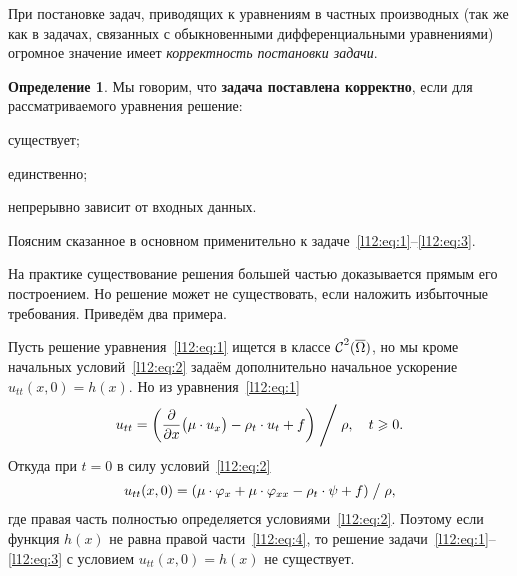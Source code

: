 \documentclass[12pt,a4paper,openany,fleqn]{book}
\newcommand{\Cf}{\ensuremath{\mathcal{C}}}
\newcommand{\Cfn}[2][]{\ensuremath{\Cf{\mathstrut}^{#2}_{#1}}}
\newcommand{\pder}[2]{\ensuremath{\frac{\partial#1}{\partial#2}}}
\theoremstyle{definition}
\newtheorem{_def}{Определение}[section]
\begin{document}
	При постановке задач, приводящих к уравнениям в частных производных (так же как в задачах, связанных с обыкновенными дифференциальными уравнениями) огромное значение имеет \emph{корректность постановки задачи}.
	\begin{_def}
		Мы говорим, что \textbf{задача поставлена корректно}, если для рассматриваемого уравнения решение:
		\begin{enumerateD}
			\item существует;
			\item единственно;
			\item непрерывно зависит от входных данных.
		\end{enumerateD} 
	\end{_def}
\noindent Поясним сказанное в основном применительно к задаче~\eqref{l12:eq:1}--\eqref{l12:eq:3}.
\begin{enumerateD}
	\item На практике существование решения большей частью доказывается прямым его построением. Но решение может не существовать, если наложить избыточные требования. Приведём два примера.
	\begin{enumerateD}
		\item Пусть решение уравнения~\eqref{l12:eq:1} ищется в классе $\Cfn{2}(\overline{\Omega})$, но мы кроме начальных условий~\eqref{l12:eq:2} задаём дополнительно начальное ускорение $u_{tt}(x,0)=h(x)$. Но из уравнения~\eqref{l12:eq:1}
		\begin{equation*}
			u_{tt}=\left(\pder{}{x}\big(\mu\cdot u_x\big)-\rho_t\cdot u_t+f\right)\Biggm/\rho,\quad t\geqslant0.
		\end{equation*}
		Откуда при $t=0$ в силу условий~\eqref{l12:eq:2}
		\begin{equation}
			\label{l12:eq:4}
			u_{tt}(x,0)=\left(\mu\cdot\phi_x+\mu\cdot\phi_{xx}-\rho_t\cdot\psi+f\right)\bigm/\rho,
		\end{equation}
		где правая часть полностью определяется условиями~\eqref{l12:eq:2}. Поэтому если функция $h(x)$ не равна правой части~\eqref{l12:eq:4}, то решение задачи~\eqref{l12:eq:1}--\eqref{l12:eq:3} с условием $u_{tt}(x,0)=h(x)$ не существует.
		

\end{enumerateD}
\end{enumerateD}
\end{document}
